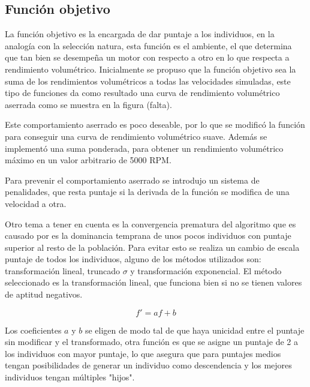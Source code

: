 \subsection{Función objetivo}
%
La función objetivo es la encargada de dar puntaje a los individuos, en la
analogía con la selección natura, esta función es el ambiente, el que determina
que tan bien se desempeña un motor con respecto a otro en lo que respecta a
rendimiento volumétrico.
%
Inicialmente se propuso que la función objetivo sea la suma de los rendimientos
volumétricos a todas las velocidades simuladas, este tipo de funciones da como
resultado una curva de rendimiento volumétrico aserrada como se muestra en la
figura (falta).

Este comportamiento aserrado es poco deseable, por lo que se modificó la
función para conseguir una curva de rendimiento volumétrico suave.
%
Además se implementó una suma ponderada, para obtener un rendimiento volumétrico
máximo en un valor arbitrario de 5000 RPM.

Para prevenir el comportamiento aserrado se introdujo un sistema de penalidades,
que resta puntaje si la derivada de la función se modifica
de una velocidad a otra.


Otro tema a tener en cuenta es la convergencia prematura del algoritmo que es
causado por es la dominancia temprana de unos pocos individuos con puntaje
superior al resto de la población.
%
Para evitar esto se realiza un cambio de escala puntaje de todos los
individuos, alguno de los métodos utilizados son: transformación lineal,
truncado $\sigma$ y transformación exponencial.
%
El método seleccionado es la transformación lineal, que funciona bien \cite{goldberg}
si no se tienen valores de aptitud negativos.

\begin{equation}
    f' = af + b
\end{equation}

Los coeficientes $a$ y $b$ se eligen de modo tal de que haya unicidad entre el
puntaje sin modificar y el transformado, otra función es que se asigne un
puntaje de 2 a los individuos con mayor puntaje, lo que asegura que para
puntajes medios tengan posibilidades de generar un individuo como descendencia y
los mejores individuos tengan múltiples "hijos".
